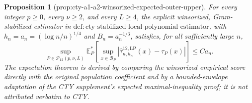 \documentclass{article}
\newtheorem{proposition}{Proposition}
\begin{document}
\begin{proposition}[prop:cty-a1-a2-winsorized-expected-outer-upper]\label{prop:cty-a1-a2-winsorized-expected-outer-upper}
For every integer \(p\geq0\), every \(\nu\geq2\), and every \(L\geq4\), the explicit winsorized, Gram-stabilized estimator in \(\mathrm{def:cty\text{-}stabilized\text{-}local\text{-}polynomial\text{-}estimator}\), with \(h_n=a_n=(\log n/n)^{1/4}\) and \(B_n=a_n^{-1/3}\), satisfies, for all sufficiently large \(n\),
\[
 \sup_{P\in\mathcal P_{12}(p,\nu,L)}
 \mathbb E_P^*\!\left[
 \sup_{x\in\mathcal B_P}
 |\widehat\tau^{12,\mathrm{LP}}_{n,h_n}(x)-\tau_P(x)|
 \right]
 \leq Ca_n.
\]
The expectation theorem is derived by comparing the winsorized empirical score directly with the original population coefficient and by a bounded-envelope adaptation of the CTY supplement's expected maximal-inequality proof; it is not attributed verbatim to CTY.
\end{proposition}
\end{document}
